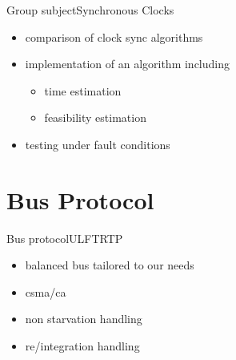 \documentclass{beamer}
\begin{document}
\begin{frame}{Group subject}{Synchronous Clocks}
  \begin{itemize}
    \item \begin{large}comparison of clock sync algorithms\end{large}
    \item \begin{large}implementation of an algorithm including\end{large}
      \begin{itemize}
	\item time estimation
	\item feasibility estimation
      \end{itemize}
    \item \begin{large}testing under fault conditions\end{large}
  \end{itemize}
\end{frame}

\section{Bus Protocol}
\begin{frame}{Bus protocol}{ULFTRTP}
\begin{center}
\begin{itemize}
  \item \begin{large}balanced bus tailored to our needs\end{large}
  \item \begin{large}csma/ca\end{large}
 \item \begin{large}non starvation handling\end{large}
 \item \begin{large}re/integration handling\end{large}
\end{itemize}
\end{center}
\end{frame}
\end{document}
